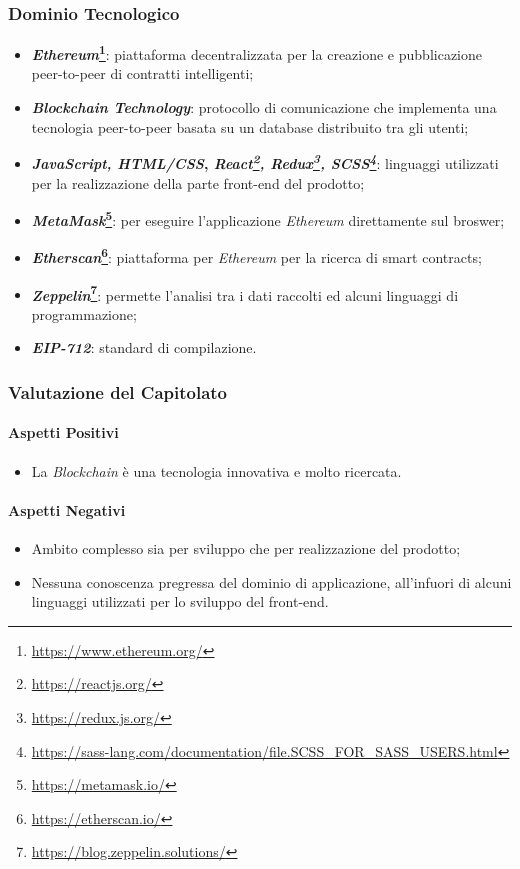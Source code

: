 \subsubsection{Dominio Tecnologico}

\begin{itemize}
  \item \textbf{\textit{Ethereum}\footnote{\url{https://www.ethereum.org/}}\glossario}: piattaforma decentralizzata per la creazione e pubblicazione peer-to-peer di contratti intelligenti;
  \item \textbf{\textit{Blockchain Technology}\glossario}: protocollo di comunicazione che implementa una tecnologia peer-to-peer basata su un database distribuito tra gli utenti;
  \item \textbf{\textit{JavaScript, HTML/CSS},  \textit{React\footnote{\url{https://reactjs.org/}}\glossario, Redux\footnote{\url{https://redux.js.org/}}\glossario, SCSS\footnote{\url{https://sass-lang.com/documentation/file.SCSS_FOR_SASS_USERS.html}}\glossario}}: linguaggi utilizzati per la realizzazione della parte front-end del prodotto;
  \item \textbf{\textit{MetaMask}\footnote{\url{https://metamask.io/}}\glossario}: per eseguire l'applicazione \textit{Ethereum} direttamente sul broswer;
  \item \textbf{\textit{Etherscan}\footnote{\url{https://etherscan.io/}}\glossario}: piattaforma per \textit{Ethereum} per la ricerca di smart contracts;
  \item \textbf{\textit{Zeppelin}\footnote{\url{https://blog.zeppelin.solutions/}}\glossario}: permette l'analisi tra i dati raccolti ed alcuni linguaggi di programmazione;
  \item \textbf{\textit{EIP-712}}: standard di compilazione.
\end{itemize}

\subsubsection{Valutazione del Capitolato}
\paragraph{Aspetti Positivi}
\begin{itemize}
  \item La \textit{Blockchain} è una tecnologia innovativa e molto ricercata.
\end{itemize}

\paragraph{Aspetti Negativi}
\begin{itemize}
  \item Ambito complesso sia per sviluppo che per realizzazione del prodotto;
  \item Nessuna conoscenza pregressa del dominio di applicazione, all'infuori di alcuni linguaggi utilizzati per lo sviluppo del front-end.
\end{itemize}

